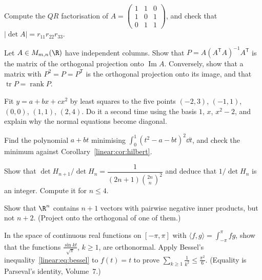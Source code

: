 \begin{exercise}[$\star$]\label{linear:ex:qr}
Compute the $QR$ factorisation of
$A=\begin{pmatrix}1&1&0\\1&0&1\\0&1&1\end{pmatrix}$, and check that $|\det A|=r_{11}r_{22}r_{33}$.
\end{exercise}

\begin{exercise}[$\star$]\label{linear:ex:projmatrix}
Let $A\in M_{m,n}(\R)$ have independent columns. Show that $P=A(A^{\mathsf T}A)^{-1}A^{\mathsf T}$ is the matrix of the
orthogonal projection onto $\operatorname{Im}A$. Conversely, show that a matrix with $P^2=P=P^{\mathsf T}$ is the
orthogonal projection onto its image, and that $\operatorname{tr}P=\operatorname{rank}P$.
\end{exercise}

\begin{exercise}[$\star\star$]\label{linear:ex:parabola}
Fit $y=a+bx+cx^2$ by least squares to the five points $(-2,3)$, $(-1,1)$, $(0,0)$, $(1,1)$, $(2,4)$. Do it a second time
using the basis $1$, $x$, $x^2-2$, and explain why the normal equations become diagonal.
\end{exercise}

\begin{exercise}[$\star$]\label{linear:ex:distpoly}
Find the polynomial $a+bt$ minimising $\int_0^1(t^2-a-bt)^2\dd t$, and check the minimum against
Corollary~\ref{linear:cor:hilbert}.
\end{exercise}

\begin{exercise}[$\star$]\label{linear:ex:hilbertint}
Show that $\det H_{n+1}/\det H_n=\dfrac1{(2n+1)\binom{2n}n^2}$ and deduce that $1/\det H_n$ is an integer. Compute it for
$n\le4$.
\end{exercise}

\begin{exercise}[$\star\star$]\label{linear:ex:obtuse}
Show that $\R^n$ contains $n+1$ vectors with pairwise negative inner products, but not $n+2$. (Project onto the
orthogonal of one of them.)
\end{exercise}

\begin{exercise}[$\star\star$]\label{linear:ex:basel}
In the space of continuous real functions on $[-\pi,\pi]$ with $\langle f,g\rangle=\int_{-\pi}^\pi fg$, show that the
functions $\frac{\sin kt}{\sqrt\pi}$, $k\ge1$, are orthonormal. Apply Bessel's inequality~\eqref{linear:eq:bessel} to $f(t)=t$ to
prove $\sum_{k\ge1}\frac1{k^2}\le\frac{\pi^2}6$. (Equality is Parseval's identity, Volume~7.)
\end{exercise}

